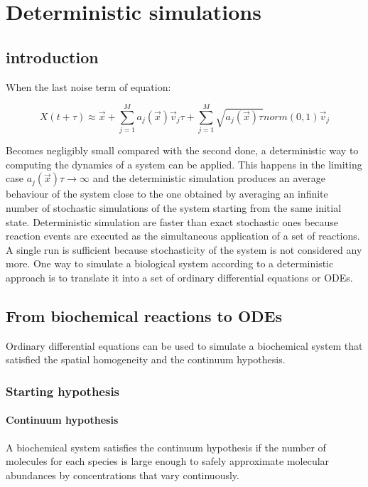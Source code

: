 \graphicspath{{chapters/05/images/}}
\chapter{Deterministic simulations}

\section{introduction}
When the last noise term of equation:

$$X(t+\tau)\approx \vec{x}+\sum\limits_{j=1}^Ma_j(\vec{x})\vec{v}_j\tau + \sum\limits_{j=1}^M\sqrt{a_j(\vec{x})\tau}norm(0,1)\vec{v}_j$$

Becomes negligibly small compared with the second done, a deterministic way to computing the dynamics of a system can be applied.
This happens in the limiting case $a_j(\vec{x})\tau\rightarrow\infty$ and the deterministic simulation produces an average behaviour of the system close to the one obtained by averaging an infinite number of stochastic simulations of the system starting from the same initial state.
Deterministic simulation are faster than exact stochastic ones because reaction events are executed as the simultaneous application of a set of reactions.
A single run is sufficient because stochasticity of the system is not considered any more.
One way to simulate a biological system according to a deterministic approach is to translate it into a set of ordinary differential equations or ODEs.

\section{From biochemical reactions to ODEs}
Ordinary differential equations can be used to simulate a biochemical system that satisfied the spatial homogeneity and the continuum hypothesis.

  \subsection{Starting hypothesis}

    \subsubsection{Continuum hypothesis}
    A biochemical system satisfies the continuum hypothesis if the number of molecules for each species is large enough to safely approximate molecular abundances by concentrations that vary continuously.



